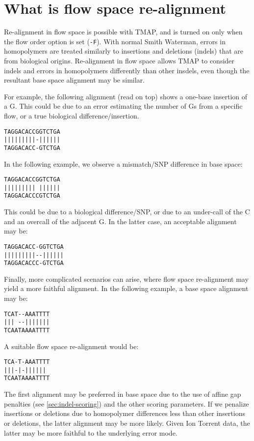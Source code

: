 \documentclass[a4paper,12pt]{book}
\newcommand{\TT}[1]{{\tt #1}} %
\begin{document}
\section{What is flow space re-alignment}
\label{sec:fs-realign}
Re-alignment in flow space is possible with TMAP, and is turned on only when the flow order option is set (\TT{-F}).
With normal Smith Waterman, errors in homopolymers are treated similarly to insertions and deletions (indels) that are from biological origins.
Re-alignment in flow space allows TMAP to consider indels and errors in homopolymers differently than other insdels, even though the resultant base space alignment may be similar.

For example, the following alignment (read on top) shows a one-base insertion of a G.
This could be due to an error estimating the number of Gs from a specific flow, or a true biological difference/insertion.
\begin{verbatim}
TAGGACACCGGTCTGA
|||||||||-||||||
TAGGACACC-GTCTGA
\end{verbatim}

In the following example, we observe a mismatch/SNP difference in base space:
\begin{verbatim}
TAGGACACCGGTCTGA
||||||||| ||||||
TAGGACACCCGTCTGA
\end{verbatim}
This could be due to a biological difference/SNP, or due to an under-call of the C and an overcall of the adjacent G.
In the latter case, an acceptable alignment may be:
\begin{verbatim}
TAGGACACC-GGTCTGA
|||||||||--||||||
TAGGACACCC-GTCTGA
\end{verbatim}

Finally, more complicated scenarios can arise, where flow space re-alignment may yield a more faithful alignment.
In the following example, a base space alignment may be:
\begin{verbatim}
TCAT--AAATTTT
||| --|||||||
TCAATAAAATTTT
\end{verbatim}
A suitable flow space re-alignment would be:
\begin{verbatim}
TCA-T-AAATTTT
|||-|-||||||
TCAATAAAATTTT
\end{verbatim}
The first alignment may be preferred in base space due to the use of affine gap penalties (see \autoref{sec:indel-scoring}) and the other scoring parameters.
If we penalize insertions or deletions due to homopolymer differences less than other insertions or deletions, the latter alignment may be more likely.
Given Ion Torrent data, the latter may be more faithful to the underlying error mode.
\end{document}

